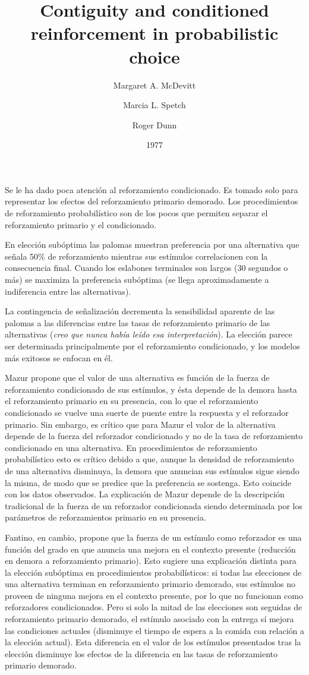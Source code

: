 \documentclass[a4paper,12pt]{article}
\title{Contiguity and conditioned reinforcement in probabilistic choice}
\author{Margaret A. McDevitt \and Marcia L. Spetch \and Roger Dunn}
\date{1977}
\begin{document}
{\scshape\bfseries \maketitle}

Se le ha dado poca atención al reforzamiento condicionado. Es tomado solo para representar los efectos del reforzamiento primario demorado. Los procedimientos de reforzamiento probabilístico son de los pocos que permiten separar el reforzamiento primario y el condicionado.

En elección subóptima las palomas muestran preferencia por una alternativa que señala 50\% de reforzamiento mientras sus estímulos correlacionen con la consecuencia final. Cuando los eslabones terminales son largos (30 segundos o más) se maximiza la preferencia subóptima (se llega aproximadamente a indiferencia entre las alternativas).

La contingencia de señalización decrementa la sensibilidad aparente de las palomas a las diferencias entre las tasas de reforzamiento primario de las alternativas ({\itshape creo que nunca había leído esa interpretación}). La elección parece ser determinada principalmente por el reforzamiento condicionado, y los modelos más exitosos se enfocan en él.

Mazur propone que el valor de una alternativa es función de la fuerza de reforzamiento condicionado de sus estímulos, y ésta depende de la demora hasta el reforzamiento primario en su presencia, con lo que el reforzamiento condicionado se vuelve una suerte de puente entre la respuesta y el reforzador primario. Sin embargo, es crítico que para Mazur el valor de la alternativa depende de la fuerza del reforzador condicionado y no de la tasa de reforzamiento condicionado en una alternativa. En procedimientos de reforzamiento probabilístico esto es crítico debido a que, aunque la densidad de reforzamiento de una alternativa disminuya, la demora que anuncian sus estímulos sigue siendo la misma, de modo que se predice que la preferencia se sostenga. Esto coincide con los datos observados. La explicación de Mazur depende de la descripción tradicional de la fuerza de un reforzador condicionada siendo determinada por los parámetros de reforzamientos primario en su presencia. 

Fantino, en cambio, propone que la fuerza de un estímulo como reforzador es una función del grado en que anuncia una mejora en el contexto presente (reducción en demora a reforzamiento primario). Esto sugiere una explicación distinta para la elección subóptima en procedimientos probabilísticos: si todas las elecciones de una alternativa terminan en reforzamiento primario demorado, sus estímulos no proveen de ninguna mejora en el contexto presente, por lo que no funcionan como reforzadores condicionados. Pero si solo la mitad de las elecciones son seguidas de reforzamiento primario demorado, el estímulo asociado con la entrega sí mejora las condiciones actuales (disminuye el tiempo de espera a la comida con relación a la elección actual). Esta diferencia en el valor de los estímulos presentados tras la elección disminuye los efectos de la diferencia en las tasas de reforzamiento primario demorado.
\end{document}
